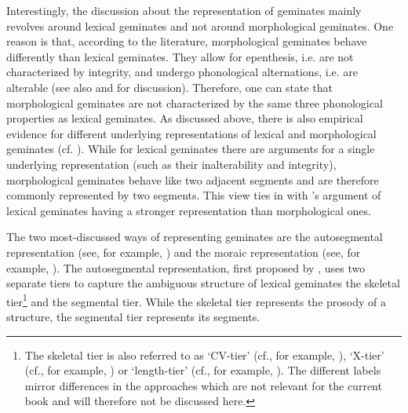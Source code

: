 Interestingly, the discussion about the representation of geminates mainly revolves around lexical geminates and not around morphological  geminates. One reason is that, according to the literature, morphological geminates behave differently than lexical geminates. They allow for epenthesis, i.e. are not characterized by integrity, and  undergo phonological alternations, i.e. are alterable (see also \citealt{Kenstowicz.1994,Kirchner.2001} and \citealt{Ridouane.2010} for discussion). Therefore, one can state that morphological geminates are not characterized by  the same three phonological properties as lexical geminates. 
As discussed above, there is also empirical evidence for different underlying representations of lexical and morphological geminates (cf. \citealt{Ridouane.2010,Galea.2014}). While for lexical geminates there are arguments for a single underlying representation (such as their inalterability and integrity), morphological geminates behave like two adjacent segments and are therefore commonly represented by two segments. This view ties in with \citeauthor{Ridouane.2010}'s argument of lexical geminates having a stronger representation than morphological ones.

The two most-discussed ways of representing geminates are the autosegmental representation (see, for example, \citealt{Leben.1980,Hayes.1986b,Levin.1985,Ridouane.2010}) and the moraic representation  (see, for example, \citealt{Hayes.1989,Davis.2014,Topintzi.2008}). 
The autosegmental representation, first proposed by \cite{Leben.1980}, uses two separate tiers to capture the ambiguous structure of lexical geminates \textendash the skeletal tier\footnote{The skeletal tier is also referred to as `CV-tier' (cf., for example, \citealt{Hayes.1986b, Ridouane.2010,Ridouane.2017}), `X-tier' (cf., for example, \citealt{Levin.1985}) or `length-tier' (cf., for example, \citealt{Vago.2011}). The different labels mirror differences in the approaches which are not relevant for the current book and will therefore not be discussed here.}
and the segmental tier. While the skeletal tier represents the prosody of a structure, the segmental tier represents its segments. 

